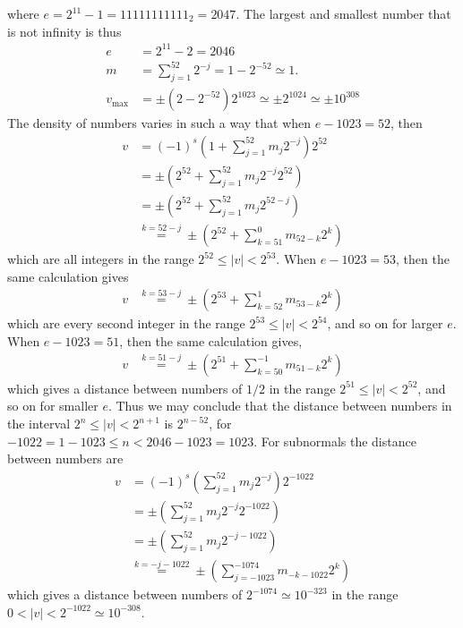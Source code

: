 where $e=2^{11}-1=11111111111_2=2047$. The largest and smallest number that is not infinity is thus
\begin{align}
  e &= 2^{11}-2 = 2046\\
  m &= \sum _{j=1}^{52}2^{-j} = 1 - 2^{-52} \simeq 1.\\
  v_\text{max} &= \pm \left(2-2^{-52}\right) 2^{1023} \simeq \pm 2^{1024} \simeq \pm 10^{308}
\end{align}
The density of numbers varies in such a way that when $e-1023 = 52$, then
\begin{align}
  v &= \left(-1\right)^{s} \left(1+\sum _{j=1}^{52}m_j2^{-j}\right) 2^{52} 
  \\&= \pm \left(2^{52}+\sum _{j=1}^{52}m_j2^{-j}2^{52}\right) 
  \\&= \pm \left(2^{52}+\sum _{j=1}^{52}m_j2^{52-j}\right) 
  \\&\overset{k=52-j}{=} \pm \left(2^{52}+\sum _{k=51}^{0}m_{52-k}2^k\right) 
\end{align}
which are all integers in the range $2^{52}\leq |v| < 2^{53}$. When $e-1023 = 53$, then the same calculation gives
\begin{align}
  v &\overset{k=53-j}{=} \pm \left(2^{53}+\sum _{k=52}^{1}m_{53-k}2^k\right) 
\end{align}
which are every second integer in the range $2^{53}\leq |v| < 2^{54}$, and so on for larger $e$. When $e-1023 = 51$, then the same calculation gives,
\begin{align}
  v &\overset{k=51-j}{=} \pm \left(2^{51}+\sum _{k=50}^{-1}m_{51-k}2^k\right) 
\end{align}
which gives a distance between numbers of $1/2$ in the range $2^{51}\leq |v| < 2^{52}$, and so on for smaller $e$. Thus we may conclude that the distance between numbers in the interval $2^n\leq |v| < 2^{n+1}$ is $2^{n-52}$, for $-1022 = 1-1023\leq n<2046-1023=1023$.  For subnormals the distance between numbers are
\begin{align}
  v &= \left(-1\right)^{s} \left(\sum _{j=1}^{52}m_j2^{-j}\right) 2^{-1022} 
  \\&= \pm \left(\sum _{j=1}^{52}m_j2^{-j}2^{-1022}\right) 
  \\&= \pm \left(\sum _{j=1}^{52}m_j2^{-j -1022}\right) 
  \\&\overset{k=-j-1022}{=} \pm \left(\sum _{j=-1023}^{-1074}m_{-k-1022}2^k\right) 
\end{align}
which gives a distance between numbers of $2^{-1074} \simeq 10^{-323}$ in the range $0<|v|<2^{-1022}\simeq10^{-308}$.

